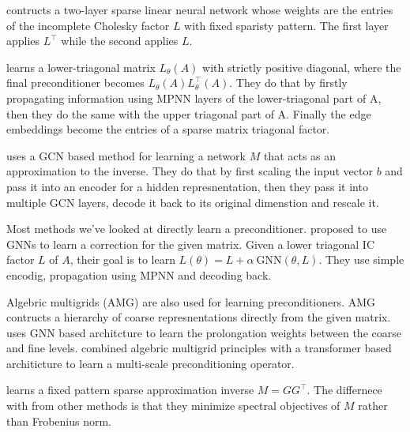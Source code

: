 \cite{boothNeuralAccelerationIncomplete} contructs a two-layer sparse linear
neural network whose weights are the entries of the incomplete Cholesky factor
$L$ with fixed sparisty pattern. The first layer applies $L^\top$
while the second applies $L$.

\cite{hausnerNeuralIncompleteFactorization2024} learns a lower-triagonal matrix
$L_\theta(A)$ with strictly positive diagonal, where the final preconditioner
becomes $L_\theta(A)L^\top_\theta(A)$. They do that by firstly propagating
information using MPNN layers of the lower-triagonal part of A, then they do
the same with the upper triagonal part of A. Finally the edge embeddings become
the entries of a sparse matrix triagonal factor.

%
\cite{chenGraphNeuralPreconditioners2025} uses a GCN based method for learning
a network $M$ that acts as an approximation to the inverse. They do that by
first scaling the input vector $b$ and pass it into an encoder for a hidden
represnentation, then they pass it into multiple GCN layers, decode it back to
its original dimenstion and rescale it.

Most methods we've looked at directly learn a preconditioner.
\cite{trifonovLearningLinearAlgebra2025} proposed to use GNNs to learn a
correction for the given matrix. Given a lower triagonal IC factor $L$ of $A$,
their goal is to learn $L(\theta) = L + \alpha\ \mathrm{GNN} (\theta,L)$. They
use simple encodig, propagation using MPNN and decoding back.

%
Algebric multigrids (AMG) are also used for learning preconditioners. AMG
contructs a hierarchy of coarse represnentations directly from the given
matrix. \cite{luzLearningAlgebraicMultigrid2020} uses GNN based architcture to
learn the prolongation weights between the coarse and fine levels.
\cite{liNeuralPreconditioningOperator2025} combined algebric multigrid
principles with a transformer based architicture to learn a multi-scale
preconditioning operator.

\cite{brardaFactoredSparseApproximate2026} learns a fixed pattern sparse
approximation inverse  $M = GG^\top$. The differnece with from other methods is
that they minimize spectral objectives of $M$ rather than Frobenius norm.


